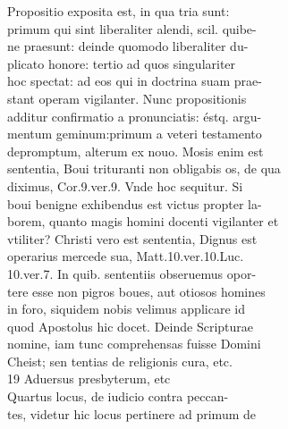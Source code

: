 \documentclass{article}
\begin{document}
\begin{pages}
                Propositio exposita est, in qua tria sunt: \\
                primum qui sint liberaliter alendi, scil. quibe- \\
                ne praesunt: deinde quomodo liberaliter du- \\
                plicato honore: tertio ad quos singulariter \\
                hoc spectat: ad eos qui in doctrina suam prae- \\
                stant operam vigilanter. Nunc propositionis \\
                additur confirmatio a pronunciatis: éstq. argu- \\
                mentum geminum:primum a veteri testamento \\
                depromptum, alterum ex nouo. Mosis enim est \\
                sententia, Boui trituranti non obligabis os, de qua \\
                diximus, Cor.9.ver.9. Vnde hoc sequitur. Si \\
                boui benigne exhibendus est victus propter la- \\
                borem, quanto magis homini docenti vigilanter et \\
                vtiliter? Christi vero est sententia, Dignus est \\
                operarius mercede sua, Matt.10.ver.10.Luc. \\
                10.ver.7. In quib. sententiis obseruemus opor- \\
                tere esse non pigros boues, aut otiosos homines \\
                in foro, siquidem nobis velimus applicare id \\
                quod Apostolus hic docet. Deinde Scripturae \\
                nomine, iam tunc comprehensas fuisse Domini \\
                Cheist; sen tentias de religionis cura, etc. \\
                19 Aduersus presbyterum, etc \\
                Quartus locus, de iudicio contra peccan- \\
                tes, videtur hic locus pertinere ad primum de \\

\end{pages}
\end{document}

